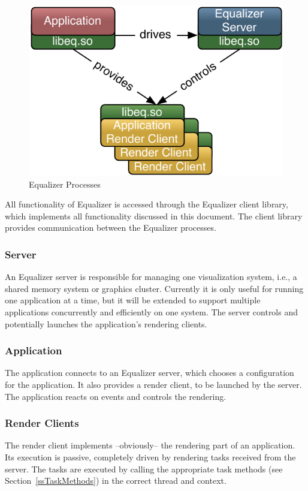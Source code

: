 \documentclass[10pt,a4]{scrartcl}
\newcommand{\sref}[1]{Section~\ref{#1}}
\begin{document}
\begin{figure}
  \includegraphics[width=.4\textwidth]{images/processes.pdf}
  {\caption{\small\label{fProcesses}Equalizer Processes}}
\end{figure}
All functionality of Equalizer is accessed through the Equalizer client
library, which implements all functionality discussed in this
document. The client library provides communication between the Equalizer
processes.

\subsubsection{Server}

An Equalizer server is responsible for managing one visualization
system, i.e., a shared memory system or graphics cluster. Currently it
is only useful for running one application at a time, but it will be
extended to support multiple applications concurrently and efficiently
on one system. The server controls and potentially launches the
application's rendering clients.

\subsubsection{Application}

The application connects to an Equalizer server, which chooses a
configuration for the application. It also provides a render client, to
be launched by the server. The application reacts on events and controls
the rendering.

\subsubsection{Render Clients}

The render client implements --obviously-- the rendering part of an
application. Its execution is passive, completely driven by rendering
tasks received from the server. The tasks are executed by calling the
appropriate task methods (see \sref{ssTaskMethods}) in the correct
thread and context.
\end{document}
